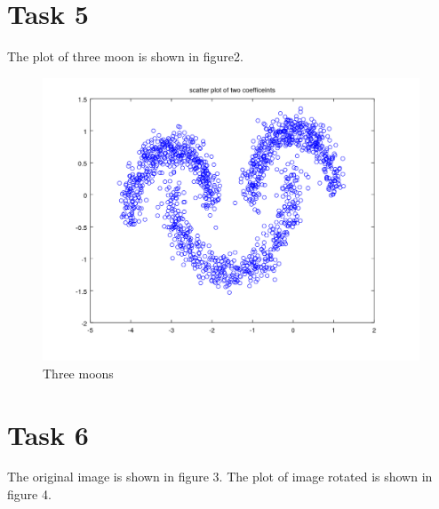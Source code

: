 \documentclass[11pt]{article}
\theoremstyle{plain}
\theoremstyle{definition}
\begin{document}
\section{Task 5}
The plot of three moon is shown in figure2. 
\begin{figure}
  \centering 
  \includegraphics[width=.5\linewidth]{Task5.png}
  \caption{Three moons}
  \label{fig:Three moons}
\end{figure}

\section{Task 6} 
The original image is shown in figure 3. The plot of image rotated is shown in figure 4.
\end{document}
